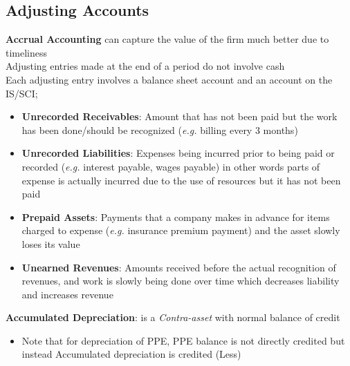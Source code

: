 \documentclass{article}
\newcommand{\eg}[0]{\textit{e.g. }}
\begin{document}
\begin{multicols}{2}
\section{Adjusting Accounts}
\textbf{Accrual Accounting} can capture the value of the firm much better due to timeliness\\
Adjusting entries made at the end of a period do not involve cash\\
Each adjusting entry involves a balance sheet account and an account on the IS/SCI;
\begin{itemize}
	\item \textbf{Unrecorded Receivables}: Amount that has not been paid but the work has been done/should be recognized (\eg billing every 3 months)
	\item \textbf{Unrecorded Liabilities}: Expenses being incurred prior to being paid or recorded (\eg interest payable, wages payable) in other words parts of expense is actually incurred due to the use of resources but it has not been paid
	\item \textbf{Prepaid Assets}: Payments that a company makes in advance for items charged to expense (\eg insurance premium payment) and the asset slowly loses its value
	\item \textbf{Unearned Revenues}: Amounts received before the actual recognition of revenues, and work is slowly being done over time which decreases liability and increases revenue
\end{itemize}
\textbf{Accumulated Depreciation}: is a \textit{Contra-asset} with normal balance of credit
\begin{itemize}
	\item Note that for depreciation of PPE, PPE balance is not directly credited but instead Accumulated depreciation is credited (Less)
\end{itemize}
\begin{table}[H]
\end{table}


\end{multicols}
\end{document}
